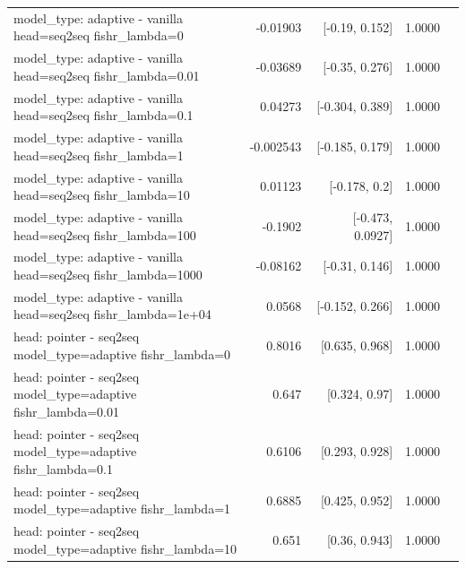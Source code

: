 \documentclass[10pt]{article}
\makeatletter
\newcommand{\stackcell}[1]{\begin{tabular}[t]{@{}l@{}}#1\end{tabular}}
\makeatother
\begin{document}
{\begin{longtable}{lrrrl}
\stackcell{model\_type: adaptive - vanilla\\\footnotesize head=seq2seq fishr\_lambda=0 } & -0.01903 & [-0.19, 0.152] & 1.0000 & \\
\stackcell{model\_type: adaptive - vanilla\\\footnotesize head=seq2seq fishr\_lambda=0.01 } & -0.03689 & [-0.35, 0.276] & 1.0000 & \\
\stackcell{model\_type: adaptive - vanilla\\\footnotesize head=seq2seq fishr\_lambda=0.1 } & 0.04273 & [-0.304, 0.389] & 1.0000 & \\
\stackcell{model\_type: adaptive - vanilla\\\footnotesize head=seq2seq fishr\_lambda=1 } & -0.002543 & [-0.185, 0.179] & 1.0000 & \\
\stackcell{model\_type: adaptive - vanilla\\\footnotesize head=seq2seq fishr\_lambda=10 } & 0.01123 & [-0.178, 0.2] & 1.0000 & \\
\stackcell{model\_type: adaptive - vanilla\\\footnotesize head=seq2seq fishr\_lambda=100 } & -0.1902 & [-0.473, 0.0927] & 1.0000 & \\
\stackcell{model\_type: adaptive - vanilla\\\footnotesize head=seq2seq fishr\_lambda=1000 } & -0.08162 & [-0.31, 0.146] & 1.0000 & \\
\stackcell{model\_type: adaptive - vanilla\\\footnotesize head=seq2seq fishr\_lambda=1e+04 } & 0.0568 & [-0.152, 0.266] & 1.0000 & \\
\stackcell{head: pointer - seq2seq\\\footnotesize model\_type=adaptive fishr\_lambda=0 } & 0.8016 & [0.635, 0.968] & 1.0000 & \\
\stackcell{head: pointer - seq2seq\\\footnotesize model\_type=adaptive fishr\_lambda=0.01 } & 0.647 & [0.324, 0.97] & 1.0000 & \\
\stackcell{head: pointer - seq2seq\\\footnotesize model\_type=adaptive fishr\_lambda=0.1 } & 0.6106 & [0.293, 0.928] & 1.0000 & \\
\stackcell{head: pointer - seq2seq\\\footnotesize model\_type=adaptive fishr\_lambda=1 } & 0.6885 & [0.425, 0.952] & 1.0000 & \\
\stackcell{head: pointer - seq2seq\\\footnotesize model\_type=adaptive fishr\_lambda=10 } & 0.651 & [0.36, 0.943] & 1.0000 & \\

\end{longtable}}
\end{document}
